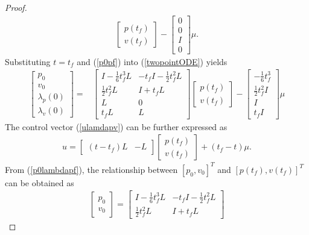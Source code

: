 \documentclass[12pt,draftcls,onecolumn]{IEEEtran}  %
\begin{document}
{\begin{proof}
\begin{align}
\begin{bmatrix}
p(t_f)\\
v(t_f)
\end{bmatrix}-\begin{bmatrix}
0\\0\\I\\0
\end{bmatrix}\mu\label{p0pf}.
\end{align}
Substituting $t=t_f$ and (\ref{p0pf}) into (\ref{twopointODE}) yields
\begin{align}
\begin{bmatrix}
p_0\\
v_0\\
\lambda_{p}(0)\\
\lambda_{v}(0)
\end{bmatrix}=&\begin{bmatrix}
I-\frac{1}{6}t_f^3L&-t_fI-\frac{1}{2}t_f^2L\\
\frac{1}{2}t_f^2L&I+t_fL\\
L&0\\
t_fL&L
\end{bmatrix}\begin{bmatrix}
p(t_f)\\
v(t_f)
\end{bmatrix}-\begin{bmatrix}
-\frac{1}{6}t_f^3\\ \frac{1}{2}t_f^2I \\I\\ t_fI
\end{bmatrix}\mu\label{p0lambdapf}
\end{align}
The control vector (\ref{ulamdapv}) can be further expressed as
\begin{align}
u=\begin{bmatrix}
(t-t_f)L&-L
\end{bmatrix}\begin{bmatrix}
p(t_f)\\
v(t_f)
\end{bmatrix}
+
(t_f-t)\mu. \label{utf}
\end{align}
From (\ref{p0lambdapf}), the relationship between $[p_0,v_0]^T$ and $[p(t_f),v(t_f)]^T$ can be obtained as
\begin{align}
\begin{bmatrix}
p_0\\
v_0
\end{bmatrix}=\begin{bmatrix}
I-\frac{1}{6}t_f^3L&-t_fI-\frac{1}{2}t_f^2L\\
\frac{1}{2}t_f^2L&I+t_fL

\end{bmatrix}
\end{align}
\end{proof}}
\end{document}

